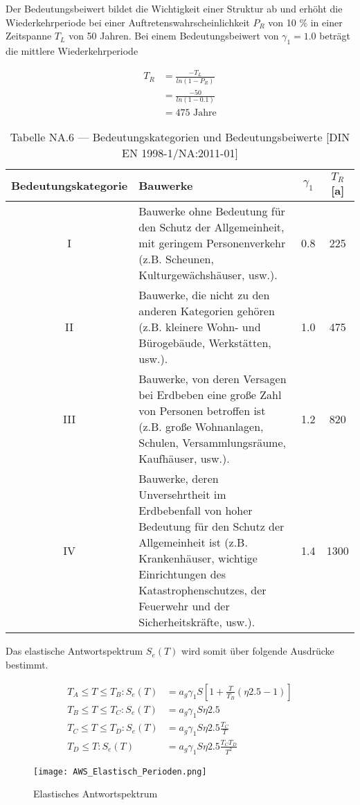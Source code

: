 \pagebreak

Der Bedeutungsbeiwert bildet die Wichtigkeit einer Struktur ab und erhöht die Wiederkehrperiode bei einer Auftretenswahrscheinlichkeit $P_R$ von 10 \% in einer Zeitspanne $T_L$ von 50 Jahren.
Bei einem Bedeutungsbeiwert von $\gamma_1 = 1.0$ beträgt die mittlere Wiederkehrperiode

\begin{align*}
T_R &= \frac{-T_L}{ln(1 - P_R)}\\
    &= \frac{-50}{ln(1 - 0.1)}\\
    &=  475 \mbox{ Jahre}
\end{align*}

\begin{table}[H]
\centering
\begin{tabular}{ |c|p{7cm}|c|c| } 
 \hline
 Bedeutungskategorie & Bauwerke & $\gamma_1$ & $T_R$ [a]\\
 \hline\hline
 I   & Bauwerke ohne Bedeutung für den Schutz der Allgemeinheit, mit geringem Personenverkehr (z.B. Scheunen, Kulturgewächshäuser, usw.). & 0.8 & 225\\
 \hline
 II  & Bauwerke, die nicht zu den anderen Kategorien gehören (z.B. kleinere Wohn- und Bürogebäude, Werkstätten, usw.). & 1.0 & 475\\
 \hline
 III & Bauwerke, von deren Versagen bei Erdbeben eine große Zahl von Personen betroffen ist (z.B. große Wohnanlagen, Schulen, Versammlungsräume, Kaufhäuser, usw.). & 1.2 & 820\\
 \hline
 IV  & Bauwerke, deren Unversehrtheit im Erdbebenfall von hoher Bedeutung für den Schutz der Allgemeinheit ist (z.B. Krankenhäuser, wichtige Einrichtungen des Katastrophenschutzes, der Feuerwehr und der Sicherheitskräfte, usw.). & 1.4 & 1300\\
 \hline
\end{tabular}
\caption{Tabelle NA.6 — Bedeutungskategorien und Bedeutungsbeiwerte [DIN EN 1998-1/NA:2011-01]}
\end{table}

\pagebreak

Das elastische Antwortspektrum $S_e(T)$ wird somit über folgende Ausdrücke bestimmt.

\begin{align*}
T_A \leq T \leq T_B: S_e(T) &= a_g\gamma_1S \left[ 1+\frac{T}{T_B}(\eta2.5-1) \right] \\
T_B \leq T \leq T_C: S_e(T) &= a_g\gamma_1S\eta2.5\\
T_C \leq T \leq T_D: S_e(T) &= a_g\gamma_1S\eta2.5\frac{T_C}{T}\\
T_D \leq T: S_e(T) &= a_g\gamma_1S\eta2.5\frac{T_CT_D}{T^2}
\end{align*}

\begin{figure}[H]
    \centering
    \texttt{[image: AWS\_Elastisch\_Perioden.png]}
    \caption{Elastisches Antwortspektrum}
\end{figure}

\pagebreak
